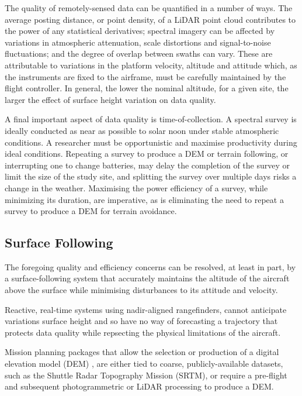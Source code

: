\documentclass[doc]{apa6}
\begin{document}
The quality of remotely-sensed data can be quantified in a number of ways. The average posting distance, or point density, of a LiDAR point cloud contributes to the power of any statistical derivatives; spectral imagery can be affected by variations in atmospheric attenuation, scale distortions and signal-to-noise fluctuations; and the degree of overlap between swaths can vary. These are attributable to variations in the platform velocity, altitude and attitude which, as the instruments are fixed to the airframe, must be carefully maintained by the flight controller. In general, the lower the nominal altitude, for a given site, the larger the effect of surface height variation on data quality.

A final important aspect of data quality is time-of-collection. A spectral survey is ideally conducted as near as possible to solar noon under stable atmospheric conditions. A researcher must be opportunistic and maximise productivity during ideal conditions. Repeating a survey to produce a DEM or terrain following, or interrupting one to change batteries, may delay the completion of the survey or limit the size of the study site, and splitting the survey over multiple days risks a change in the weather. Maximising the power efficiency of a survey, while minimizing its duration, are imperative, as is eliminating the need to repeat a survey to produce a DEM for terrain avoidance.


\subsection{Surface Following}

The foregoing quality and efficiency concerns can be resolved, at least in part, by a surface-following system that accurately maintains the altitude of the aircraft above the surface while minimising disturbances to its attitude and velocity. 

Reactive, real-time systems using nadir-aligned rangefinders, cannot anticipate variations surface height and so have no way of forecasting a trajectory that protects data quality while repsecting the physical limitations of the aircraft.

Mission planning packages that allow the selection or production of a digital elevation model (DEM) \parencite[e.g.,][]{PrecisionHawk2018,UgCS2018,MapsMadeEasy2018}, are either tied to coarse, publicly-available datasets, such as the Shuttle Radar Topography Mission (SRTM), or require a pre-flight and subsequent photogrammetric or LiDAR processing to produce a DEM. 
\end{document}
